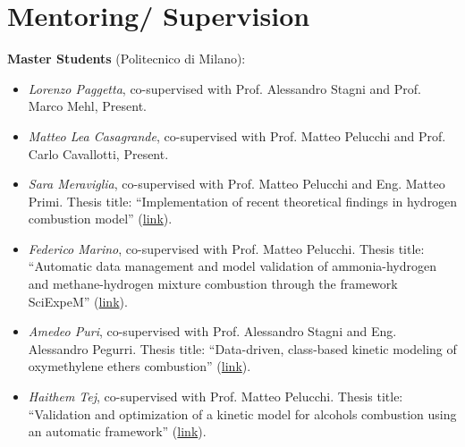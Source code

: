 \section{\sc Mentoring/ Supervision}

{\bf Master Students} (Politecnico di Milano):

\begin{itemize}
   \item [ ] {\it Lorenzo Paggetta}, co-supervised with Prof. Alessandro Stagni and
   Prof. Marco Mehl, Present.

   \item [ ] {\it Matteo Lea Casagrande}, co-supervised with
      Prof. Matteo Pelucchi and Prof. Carlo Cavallotti, Present.

   \item [ ] {\it Sara Meraviglia}, co-supervised with Prof. Matteo Pelucchi and Eng.
      Matteo Primi. Thesis title: ``Implementation of recent theoretical findings in
      hydrogen combustion model'' (\href{https://hdl.handle.net/10589/214934}{link}).

   \item [ ] {\it Federico Marino}, co-supervised with Prof. Matteo Pelucchi. Thesis
      title: ``Automatic data management and model validation of ammonia-hydrogen and
      methane-hydrogen mixture combustion through the framework SciExpeM''
      (\href{https://hdl.handle.net/10589/212616}{link}).

   \item [ ] {\it Amedeo Puri}, co-supervised with Prof. Alessandro Stagni and Eng.
      Alessandro Pegurri. Thesis title: ``Data-driven, class-based kinetic modeling of
      oxymethylene ethers combustion'' (\href{https://hdl.handle.net/10589/206686}{link}).

   \item [ ] {\it Haithem Tej}, co-supervised with Prof. Matteo Pelucchi. Thesis title:
      ``Validation and optimization of a kinetic model for alcohols combustion using an
      automatic framework'' (\href{https://hdl.handle.net/10589/210401}{link}).

\end{itemize}

